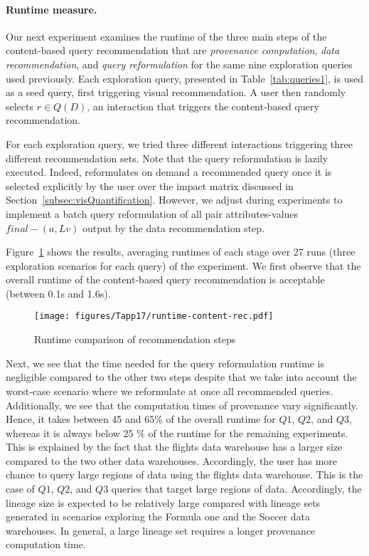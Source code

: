   \paragraph*{\textbf{Runtime measure.}}

Our next experiment examines the runtime of the three main steps of the content-based query recommendation that are \emph{provenance computation}, \emph{data recommendation}, and \emph{query reformulation} for the same nine exploration queries used previously. 
Each exploration query, presented in Table~\ref{tab:queries1}, is used as a seed query, first triggering visual recommendation. A user then randomly selects $r \in Q(D)$, an interaction that triggers the content-based query recommendation. 


For each exploration query, we tried three different interactions triggering three different recommendation sets.
Note that the query reformulation is lazily executed. Indeed, \prototype{} reformulates on demand a recommended query once it is selected explicitly by the user over the impact matrix discussed in Section~\ref{subsec:visQuantification}. 
However, we adjust \prototype{} during experiments to implement a batch query reformulation of all pair attributes-values $final-(a,Lv)$ output by the data recommendation step.


Figure~\ref{fig:exper2} shows the results, averaging runtimes of each stage over 27 runs (three exploration scenarios for each query) of the experiment. We first observe that the overall runtime of the content-based query recommendation is acceptable (between 0.1s and 1.6s).
  \begin{figure}[t]
\centering
\texttt{[image: figures/Tapp17/runtime-content-rec.pdf]}
\caption{Runtime comparison of recommendation steps}
\label{fig:exper2}
\end{figure}
Next, we see that the time needed for the query reformulation runtime is negligible compared to the other two steps despite that we take into account the worst-case scenario where we reformulate at once all recommended queries. 
Additionally, we see that the computation times of provenance vary significantly.
Hence, it takes between 45 and 65\% of the overall runtime for $Q1$, $Q2$, and $Q3$, whereas it is always below 25 \% of the runtime for the remaining experiments.
This is explained by the fact that the flights data warehouse has a larger size compared to the two other data warehouses. Accordingly, the user has more chance to query large regions of data using the flights data warehouse. This is the case of $Q1$, $Q2$, and $Q3$ queries that target large regions of data. Accordingly, the lineage size is expected to be relatively large compared with lineage sets generated in scenarios exploring the Formula one and the Soccer data warehouses. In general, a large lineage set requires a longer provenance computation time.

